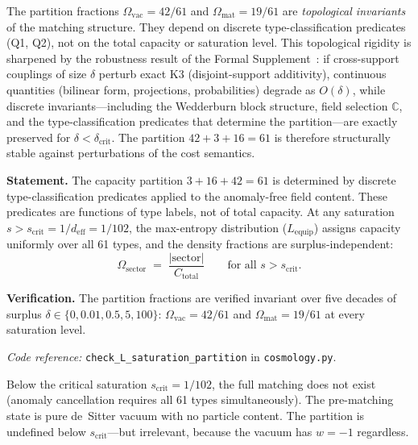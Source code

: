 \documentclass[11pt]{article}
\newcommand{\coderef}[2]{\smallskip\noindent\textit{Code reference:} \texttt{#1} in \texttt{#2}.}
\begin{document}
The partition fractions $\Omega_{\mathrm{vac}} = 42/61$ and $\Omega_{\mathrm{mat}} = 19/61$ are \emph{topological invariants} of the matching structure.  They depend on discrete type-classification predicates (Q1, Q2), not on the total capacity or saturation level.  This topological rigidity is sharpened by the robustness result of the Formal Supplement~\cite{BrookeSupplement}: if cross-support couplings of size $\delta$ perturb exact K3 (disjoint-support additivity), continuous quantities (bilinear form, projections, probabilities) degrade as $O(\delta)$, while discrete invariants---including the Wedderburn block structure, field selection $\mathbb{C}$, and the type-classification predicates that determine the partition---are exactly preserved for $\delta < \delta_{\mathrm{crit}}$.  The partition $42 + 3 + 16 = 61$ is therefore structurally stable against perturbations of the cost semantics.

\begin{tcolorbox}[apfbox, title={$L_{\mathrm{sat,part}}$ (Saturation-Independent Partition)}]
\textbf{Statement.}  The capacity partition $3 + 16 + 42 = 61$ is determined by discrete type-classification predicates applied to the anomaly-free field content.  These predicates are functions of type labels, not of total capacity.  At any saturation $s > s_{\mathrm{crit}} = 1/d_{\mathrm{eff}} = 1/102$, the max-entropy distribution ($L_{\mathrm{equip}}$) assigns capacity uniformly over all 61 types, and the density fractions are surplus-independent:
\begin{equation}
\Omega_{\mathrm{sector}} \;=\; \frac{|\mathrm{sector}|}{C_{\mathrm{total}}} \qquad \text{for all } s > s_{\mathrm{crit}}.
\label{eq:omega_sector}
\end{equation}

\smallskip\noindent\textbf{Verification.}  The partition fractions are verified invariant over five decades of surplus $\delta \in \{0, 0.01, 0.5, 5, 100\}$: $\Omega_{\mathrm{vac}} = 42/61$ and $\Omega_{\mathrm{mat}} = 19/61$ at every saturation level.

\coderef{check\_L\_saturation\_partition}{cosmology.py}
\end{tcolorbox}

Below the critical saturation $s_{\mathrm{crit}} = 1/102$, the full matching does not exist (anomaly cancellation requires all 61 types simultaneously).  The pre-matching state is pure de~Sitter vacuum with no particle content.  The partition is undefined below $s_{\mathrm{crit}}$---but irrelevant, because the vacuum has $w = -1$ regardless.
\end{document}

